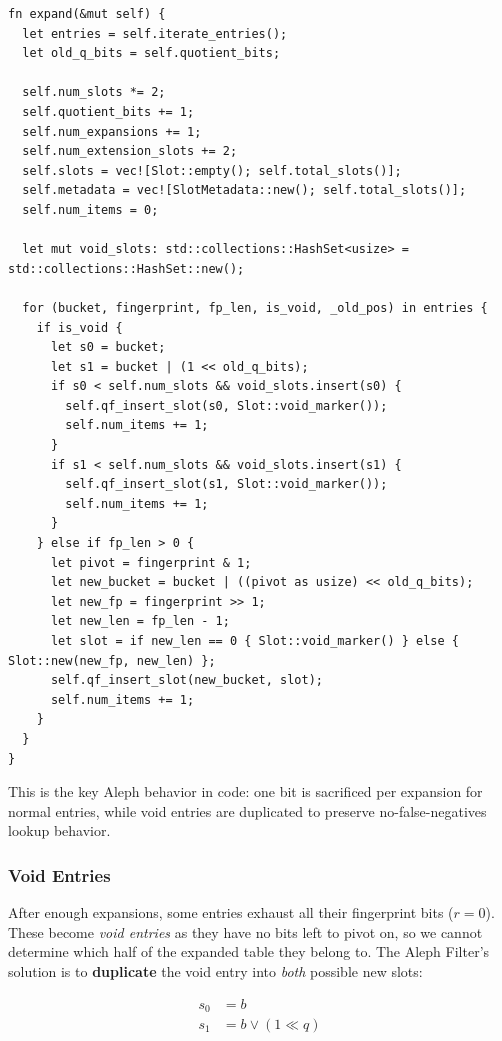 \begin{lstlisting}[caption={Expansion core in our Rust implementation}]
fn expand(&mut self) {
  let entries = self.iterate_entries();
  let old_q_bits = self.quotient_bits;

  self.num_slots *= 2;
  self.quotient_bits += 1;
  self.num_expansions += 1;
  self.num_extension_slots += 2;
  self.slots = vec![Slot::empty(); self.total_slots()];
  self.metadata = vec![SlotMetadata::new(); self.total_slots()];
  self.num_items = 0;

  let mut void_slots: std::collections::HashSet<usize> = std::collections::HashSet::new();

  for (bucket, fingerprint, fp_len, is_void, _old_pos) in entries {
    if is_void {
      let s0 = bucket;
      let s1 = bucket | (1 << old_q_bits);
      if s0 < self.num_slots && void_slots.insert(s0) {
        self.qf_insert_slot(s0, Slot::void_marker());
        self.num_items += 1;
      }
      if s1 < self.num_slots && void_slots.insert(s1) {
        self.qf_insert_slot(s1, Slot::void_marker());
        self.num_items += 1;
      }
    } else if fp_len > 0 {
      let pivot = fingerprint & 1;
      let new_bucket = bucket | ((pivot as usize) << old_q_bits);
      let new_fp = fingerprint >> 1;
      let new_len = fp_len - 1;
      let slot = if new_len == 0 { Slot::void_marker() } else { Slot::new(new_fp, new_len) };
      self.qf_insert_slot(new_bucket, slot);
      self.num_items += 1;
    }
  }
}
\end{lstlisting}

This is the key Aleph behavior in code: one bit is sacrificed per expansion for normal entries, while void entries are duplicated to preserve no-false-negatives lookup behavior.

\subsubsection{Void Entries}

After enough expansions, some entries exhaust all their fingerprint bits ($r = 0$). These become \textit{void entries} as they have no bits left to pivot on, so we cannot determine which half of the expanded table they belong to. The Aleph Filter's solution is to \textbf{duplicate} the void entry into \textit{both} possible new slots:

\begin{align}
    s_0 &= b \\
    s_1 &= b \lor (1 \ll q)
\end{align}

